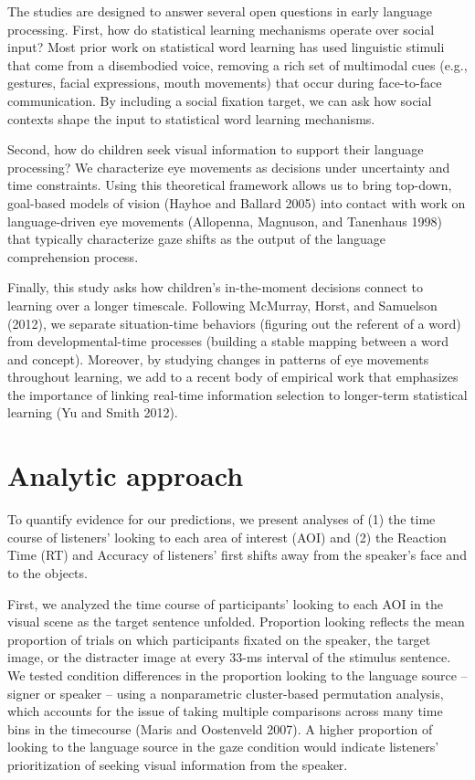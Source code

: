 \documentclass[10pt, letterpaper]{article}
\begin{document}
The studies are designed to answer several open questions in early
language processing. First, how do statistical learning mechanisms
operate over social input? Most prior work on statistical word learning
has used linguistic stimuli that come from a disembodied voice, removing
a rich set of multimodal cues (e.g., gestures, facial expressions, mouth
movements) that occur during face-to-face communication. By including a
social fixation target, we can ask how social contexts shape the input
to statistical word learning mechanisms.

Second, how do children seek visual information to support their
language processing? We characterize eye movements as decisions under
uncertainty and time constraints. Using this theoretical framework
allows us to bring top-down, goal-based models of vision (Hayhoe and
Ballard 2005) into contact with work on language-driven eye movements
(Allopenna, Magnuson, and Tanenhaus 1998) that typically characterize
gaze shifts as the output of the language comprehension process.

Finally, this study asks how children's in-the-moment decisions connect
to learning over a longer timescale. Following McMurray, Horst, and
Samuelson (2012), we separate situation-time behaviors (figuring out the
referent of a word) from developmental-time processes (building a stable
mapping between a word and concept). Moreover, by studying changes in
patterns of eye movements throughout learning, we add to a recent body
of empirical work that emphasizes the importance of linking real-time
information selection to longer-term statistical learning (Yu and Smith
2012).

\hypertarget{analytic-approach}{%
\section{Analytic approach}\label{analytic-approach}}

To quantify evidence for our predictions, we present analyses of (1) the
time course of listeners' looking to each area of interest (AOI) and (2)
the Reaction Time (RT) and Accuracy of listeners' first shifts away from
the speaker's face and to the objects.

First, we analyzed the time course of participants' looking to each AOI
in the visual scene as the target sentence unfolded. Proportion looking
reflects the mean proportion of trials on which participants fixated on
the speaker, the target image, or the distracter image at every 33-ms
interval of the stimulus sentence. We tested condition differences in
the proportion looking to the language source -- signer or speaker --
using a nonparametric cluster-based permutation analysis, which accounts
for the issue of taking multiple comparisons across many time bins in
the timecourse (Maris and Oostenveld 2007). A higher proportion of
looking to the language source in the gaze condition would indicate
listeners' prioritization of seeking visual information from the
speaker.
\end{document}
